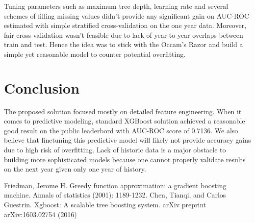 \documentclass{llncs}
\begin{document}
Tuning parameters such as maximum tree depth, learning rate and several schemes of filling missing values didn't provide any significant gain on AUC-ROC estimated with simple stratified cross-validation on the one year data. Moreover, fair cross-validation wasn't feasible due to lack of year-to-year overlaps between train and test. Hence the idea was to stick with the Occam's Razor and build a simple yet reasonable model to counter potential overfitting.

	
\section{Conclusion}

The proposed solution focused mostly on detailed feature engineering. When it comes to predictive modeling, standard XGBoost solution achieved a reasonable good result on the public leaderbord with AUC-ROC score of 0.7136. We also believe that finetuning this predictive model will likely not provide accuracy gains due to high risk of overfitting. Lack of historic data is a major obstacle to building more sophisticated models because one cannot properly validate results on the next year given only one year of history. 

\begin{thebibliography}{1}
Friedman, Jerome H.
Greedy function approximation: a gradient boosting machine.
Annals of statistics (2001): 1189-1232.
Chen, Tianqi, and Carlos Guestrin.
Xgboost: A scalable tree boosting system.
arXiv preprint arXiv:1603.02754 (2016)
\end{thebibliography}
	
\end{document}
